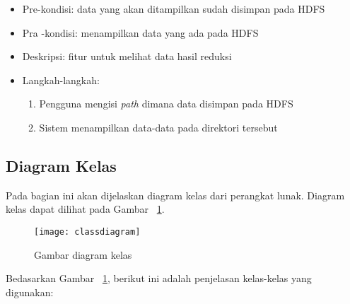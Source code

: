 \begin{enumerate}
\begin{itemize}
\item Pre-kondisi: data yang akan ditampilkan sudah disimpan pada HDFS

\item Pra -kondisi: menampilkan data yang ada pada HDFS

\item Deskripsi: fitur untuk melihat data hasil reduksi

\item Langkah-langkah:

\begin{enumerate}

\item Pengguna mengisi \textit{path} dimana data disimpan pada HDFS

\item Sistem menampilkan data-data pada direktori tersebut

\end{enumerate}

\end{itemize}

\end{enumerate}


\subsection{Diagram Kelas}

Pada bagian ini akan dijelaskan diagram kelas dari perangkat lunak. Diagram kelas dapat dilihat pada Gambar ~\ref{fig:classdiagram}.

\begin{figure}[H]
    \centering  
    \texttt{[image: classdiagram]}  
    \caption[Gambar diagram kelas]{Gambar diagram kelas} 
    \label{fig:classdiagram} 
\end{figure}

Bedasarkan Gambar ~\ref{fig:classdiagram}, berikut ini adalah penjelasan kelas-kelas yang digunakan:

